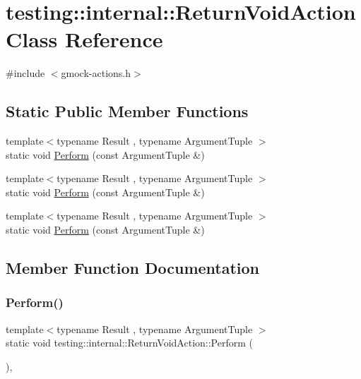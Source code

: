 \hypertarget{classtesting_1_1internal_1_1_return_void_action}{}\section{testing\+::internal\+::Return\+Void\+Action Class Reference}
\label{classtesting_1_1internal_1_1_return_void_action}


{\ttfamily \#include $<$gmock-\/actions.\+h$>$}

\subsection*{Static Public Member Functions}
\begin{DoxyCompactItemize}
\item 
{\footnotesize template$<$typename Result , typename Argument\+Tuple $>$ }\\static void \mbox{\hyperlink{classtesting_1_1internal_1_1_return_void_action_ab9ea50ff501225b7510a623d0f0a405e}{Perform}} (const Argument\+Tuple \&)
\item 
{\footnotesize template$<$typename Result , typename Argument\+Tuple $>$ }\\static void \mbox{\hyperlink{classtesting_1_1internal_1_1_return_void_action_ab9ea50ff501225b7510a623d0f0a405e}{Perform}} (const Argument\+Tuple \&)
\item 
{\footnotesize template$<$typename Result , typename Argument\+Tuple $>$ }\\static void \mbox{\hyperlink{classtesting_1_1internal_1_1_return_void_action_ab9ea50ff501225b7510a623d0f0a405e}{Perform}} (const Argument\+Tuple \&)
\end{DoxyCompactItemize}


\subsection{Member Function Documentation}
\mbox{\label{classtesting_1_1internal_1_1_return_void_action_ab9ea50ff501225b7510a623d0f0a405e}} 
\subsubsection{\texorpdfstring{Perform()}{Perform()}\hspace{0.1cm}{\footnotesize\ttfamily [1/3]}}
{\footnotesize\ttfamily template$<$typename Result , typename Argument\+Tuple $>$ \\
static void testing\+::internal\+::\+Return\+Void\+Action\+::\+Perform (\begin{DoxyParamCaption}\item[{const Argument\+Tuple \&}]{ }\end{DoxyParamCaption})\hspace{0.3cm}{\ttfamily [inline]}, {\ttfamily [static]}}

